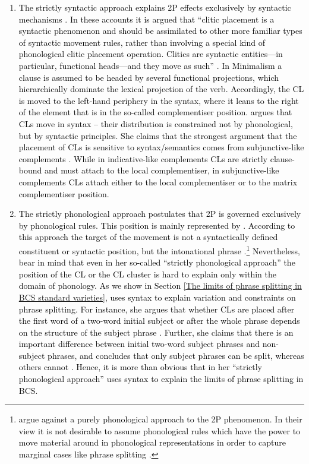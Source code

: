 \begin{enumerate}

\item \textcolor{black}{The strictly syntactic approach explains 2P effects exclusively by syntactic mechanisms \citep[e.g.][]{Progovac96, Progovac93c, Franks97}. In these accounts it is argued that ``clitic placement is a syntactic phenomenon and should be assimilated to other more familiar types of syntactic movement rules, rather than involving a special kind of phonological clitic placement operation. Clitics are syntactic entities—in particular, functional heads—and they move as such'' \citep[111]{Franks97}. In Minimalism a clause is assumed to be headed by several functional projections, which hierarchically dominate the lexical projection of the verb. Accordingly, the CL is moved to the left-hand periphery in the syntax, where it leans to the right of the element that is in the so-called complementiser position. \citet[412]{Progovac96} argues that CLs move in syntax – their distribution is constrained not by phonological, but by syntactic principles. She claims that the strongest argument that the placement of CLs is sensitive to syntax/semantics comes from subjunctive-like complements \citep[422f]{Progovac96}. While in in\-di\-ca\-tive-like complements CLs are strictly clause-bound and must attach to the local complementiser, in subjunctive-like complements CLs attach either to the local complementiser or to the matrix complementiser position.}  

\item \textcolor{black}{The strictly phonological approach postulates that 2P is governed exclusively by phonological rules. This position is mainly represented by \citet{RadanovicKocic88, RadanovicKocic96}. According to this approach the target of the movement is not a syntactically defined constituent or syntactic position, but the intonational phrase \citep[441]{RadanovicKocic96}.\footnote{\textcolor{black}{\citet[441]{CavarWilder94} argue against a purely phonological approach to the 2P phenomenon. In their view it is not desirable to assume phonological rules which have the power to move material around in phonological representations in order to capture marginal cases like phrase splitting \citep[cf.][441]{CavarWilder94}.}} Nevertheless, bear in mind that even in her so-called ``strictly phonological approach'' the position of the CL or the CL cluster is hard to explain only within the domain of phonology. As we show in Section \ref{The limits of phrase splitting in BCS standard varieties}, \citet{RadanovicKocic88} uses syntax to explain variation and constraints on phrase splitting. For instance, she argues that whether CLs are placed after the first word of a two-word initial subject or after the whole phrase depends on the structure of the subject phrase \citep[cf.][112]{RadanovicKocic88}. Further, she claims that there is an important difference between initial two-word subject phrases and non-subject phrases, and concludes that only subject phrases can be split, whereas others cannot \citep[111]{RadanovicKocic88}. Hence, it is more than obvious that in her ``strictly phonological approach'' \citet{RadanovicKocic88} uses syntax to explain the limits of phrase splitting in BCS.} 


\end{enumerate}
